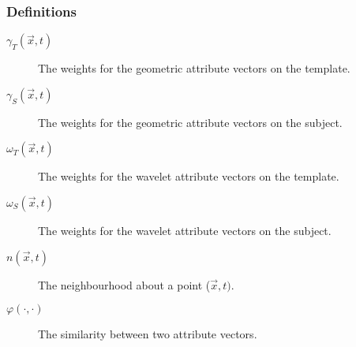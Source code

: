 \documentclass{article}
\begin{document}
\subsubsection{Definitions}

\begin{description}
  \item[$\gamma_T ( \vec{x}, t )$] The weights for the geometric attribute
  vectors on the template.
  
  \item[$\gamma_S ( \vec{x}, t )$] The weights for the geometric attribute
  vectors on the subject.
  
  \item[$\omega_T ( \vec{x}, t )$] The weights for the wavelet attribute
  vectors on the template.
  
  \item[$\omega_S ( \vec{x}, t )$] The weights for the wavelet attribute
  vectors on the subject.
  
  \item[$n ( \vec{x}, t )$]   The neighbourhood about a point ($\vec{x}, t )$.
  
  \item[$\varphi ( \cdot, \cdot )$]   The similarity between two attribute
  vectors.
\end{description}
\end{document}
